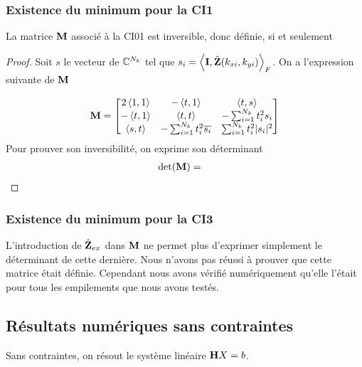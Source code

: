       \subsubsection{Existence du minimum pour la CI1}

      \begin{prop}
        La matrice \({\mathbf{M}}\) associé à la CI01 est inversible, donc définie, si et seulement
      \end{prop}

      \begin{proof}
        Soit \(s\) le vecteur de \(\mathbb C^{N_{k}}\) tel que \(s_i = \left<{\mathbf{I}},{\hat{\mathbf{Z}}(k_{xi},k_{yi})}\right>_F\). On a l'expression suivante de \({\mathbf{M}}\)

        \begin{equation*}
          {\mathbf{M}} = \begin{bmatrix}
          2\left<{1},{1}\right>  & -\left<{t},{1}\right> & \left<{t},{s}\right>
          \\
          -\left<{t},{1}\right> & \left<{t},{t}\right> & -\sum_{i=1}^{N_{k}} t_i^2 s_i
          \\
          \left<{s},{t}\right> & -\sum_{i=1}^{N_{k}} t_i^2 {\overline{s_i}} & \sum_{i=1}^{N_{k}} t_i^2 |s_i|^2
          \end{bmatrix}
        \end{equation*}
        Pour prouver son inversibilité, on exprime son déterminant 
        \begin{align*}
          \det( {\mathbf{M}}) &= 
        \end{align*}
      \end{proof}

      \subsubsection{Existence du minimum pour la CI3}

        L'introduction de \(\hat{\mathbf{Z}}_{ex}\) dans \(\mathbf{M}\) ne permet plus d'exprimer simplement le déterminant de cette dernière. Nous n'avons pas réussi à prouver que cette matrice était définie. Cependant nous avons vérifié numériquement qu'elle l'était pour tous les empilements que nous avons testés.

  \subsection{Résultats numériques sans contraintes}

      Sans contraintes, on résout le système linéaire \(\mathbf{H} X = b\). 

